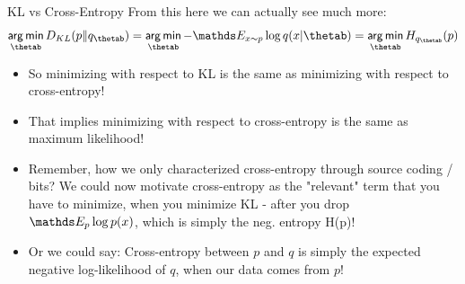 \begin{vbframe}{KL vs Cross-Entropy}
From this here we can actually see much more:
$$ \argmin_{\thetab} D_{KL}(p \| q_{\thetab}) = \argmin_{\thetab} -\E_{x \sim p} \log q(x|\thetab) = \argmin_{\thetab} H_{q_{\thetab}}(p) $$
  \begin{itemize}
    \item So minimizing with respect to KL is the same as minimizing with respect to cross-entropy! 
    \item That implies minimizing with respect to cross-entropy is the same as maximum likelihood!
    \item Remember, how we only characterized cross-entropy through source coding / bits? We could now motivate cross-entropy as the "relevant" term that you have to minimize, when you minimize KL - after you drop $\E_p \log p(x)$, which is simply the neg. entropy H(p)!
    \item Or we could say: Cross-entropy between $p$ and $q$ is simply the expected negative log-likelihood of $q$, when our data comes from $p$!
  \end{itemize}
\end{vbframe}

